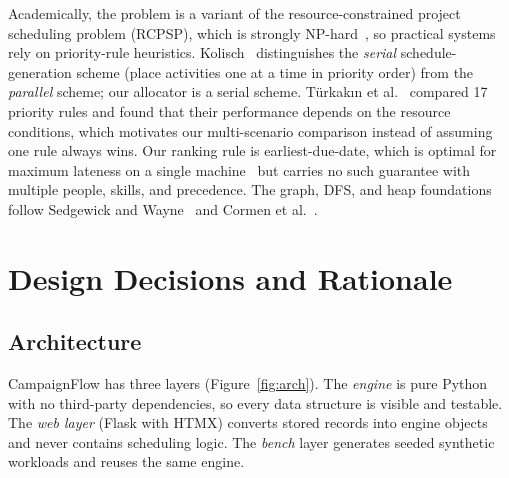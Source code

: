 \documentclass[sigconf,nonacm]{acmart}
\begin{document}
Academically, the problem is a variant of the resource-constrained project scheduling
problem (RCPSP), which is strongly NP-hard~\cite{blazewicz1983}, so practical systems rely
on priority-rule heuristics. Kolisch~\cite{kolisch1996} distinguishes the \emph{serial}
schedule-generation scheme (place activities one at a time in priority order) from the
\emph{parallel} scheme; our allocator is a serial scheme. Türkakın et al.~\cite{turkakin2021}
compared 17 priority rules and found that their performance depends on the resource
conditions, which motivates our multi-scenario comparison instead of assuming one rule
always wins. Our ranking rule is earliest-due-date, which is optimal for maximum lateness
on a single machine~\cite{jackson1955} but carries no such guarantee with multiple
people, skills, and precedence. The graph, DFS, and heap foundations follow Sedgewick and
Wayne~\cite{sedgewick-digraph,sedgewick-pq} and Cormen et al.~\cite{clrs}.

\section{Design Decisions and Rationale}
\subsection{Architecture}
CampaignFlow has three layers (Figure~\ref{fig:arch}). The \emph{engine} is pure Python
with no third-party dependencies, so every data structure is visible and testable. The
\emph{web layer} (Flask with HTMX) converts stored records into engine objects and never
contains scheduling logic. The \emph{bench} layer generates seeded synthetic workloads and
reuses the same engine.
\end{document}
